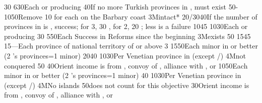{}{30}{}%
%
%
{6}{30}{Each \COL or \TP producing \POSPICE}%
%
%
%
%
{}{40}{If no more Turkish provinces in \payshongrie, \paystransylvanie must
  exist}%
%
%
%
{50-10}{50}{Remove 10 \VPs for each \Presidio on the Barbary coast}%
%
\EUobjective3M{\payscrimee intact*}{}%
{20/30}{40}{If the number of provinces in \payscrimee is , success; for
  3, 30 \VPs, for 2, 20 \VPs; less is a failure}%
%
%
{10}{45}{}%
%
%
{10}{30}{Each \COL or \TP producing \POSPICE}%
%
%
%
{}{30}{}%
%
%
{5}{50}{Each Success in Reforms since the beginning}%
%
\EUobjective3M{\payscrimee exists}{}%
{}{50}{}%
%
%
{15}{45}{}%
%
%
{15}{---}{Each province of national territory of  or
   above 3}%
%
 
%
%
{15}{50}{Each minor in \EG or better (2 's provinces=1 minor)}%
%
%
{20}{40}{}%
%
%
{10}{30}{Per Venetian province in \regionBalkans (except
  \provinceHellas/\provinceMoreas)}%
%
\EUobjective4M{\paysmamelouks not conquered}{}%
{}{50}{}%
%
%
{}{40}{Orient income is from , convoy of \villeIzmir,
  alliance with \paysaden, \paysoman or \paysgujarat}%
%
%
%
{10}{50}{Each minor in \EG or better (2 's provinces=1 minor)}%
%
%
{}{40}{}%
%
%
{10}{30}{Per Venetian province in \regionBalkans (except
  \provinceHellas/\provinceMoreas)}%
%
\EUobjective4M{No \TUR islands}{}%
{}{50}{\provinceRhodos does not count for this objective}%
%
%
{}{30}{Orient income is from , convoy of \villeIzmir,
  alliance with \paysaden, \paysoman or \paysgujarat}%
%
%
%
